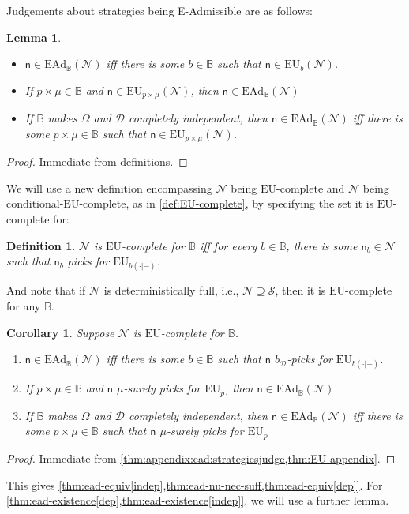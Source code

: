 \documentclass[a4paper]{article}
\newtheorem{definition}{Definition}
\newtheorem{lemma}[theorem]{Lemma}
\newtheorem{corollary}[theorem]{Corollary}
\newcommand\EU{\mathrm{EU}}
\newcommand\EAd{\mathrm{EAd}}
\newcommand{\Decs}{\mathcal{D}}
\renewcommand\S{\mathcal{S}}
\newcommand{\n}{\mathsf{n}}
\renewcommand{\nu}{\n}
\newcommand\Nu{\mathcal{N}}
\newcommand{\IB}{\mathbb{B}}
\renewcommand{\color}[1]{}
\newenvironment{colored}[1]{\leavevmode\color{#1}}{}
\newenvironment{CCM rewritten}
{\begingroup\color{blue}} %
{\endgroup}              %
\begin{document}
\begin{colored}{violet}
Judgements about strategies being E-Admissible are as follows:
\begin{lemma}\label{thm:appendix:ead:strategiesjudge}
	\begin{itemize}
		\item $\nu\in\EAd_\IB(\Nu)$ iff there is some $b\in\IB$ such that $\nu\in\EU_b(\Nu)$.  
		\item If $p\times\mu\in \IB$ and $\nu\in\EU_{p\times\mu}(\Nu)$, then $\nu\in\EAd_\IB(\Nu)$ 
		\item If $\IB$ makes $\Omega$ and $\Decs$ completely independent, then $\nu\in\EAd_\IB(\Nu)$ iff there is some $p\times\mu\in\IB$ such that $\nu\in\EU_{p\times\mu}(\Nu)$.  
	\end{itemize}
\end{lemma}
\begin{proof}
	Immediate from definitions. 
\end{proof}
We will use a new definition encompassing $\Nu$ being $\EU$-complete and $\Nu$ being conditional-$\EU$-complete, as in \cref{def:EU-complete}, by specifying the set it is $\EU$-complete for: 
\begin{definition}
	$\Nu$ is $\EU$-complete for $\IB$ iff for every $b\in\IB$, there is some $\nu_b\in\Nu$ such that $\nu_b$ picks for $\EU_{b(\cdot|-)}$. 
\end{definition}
And note that if $\Nu$ is deterministically full, i.e., $\Nu\supseteq\S$, then it is $\EU$-complete for any $\IB$. 
\begin{corollary}\label{thm:appendix:ead:eu}
	Suppose $\Nu$ is $\EU$-complete for $\IB$.
	\begin{enumerate}
		\item $\nu\in\EAd_\IB(\Nu)$ iff there is some $b\in\IB$ such that $\nu$ $b_\Decs$-picks for $\EU_{b(\cdot|-)}$.  
		\item \label{itm:ead:2}If $p\times\mu\in \IB$ and $\nu$ $\mu$-surely picks for $\EU_p$, then $\nu\in\EAd_\IB(\Nu)$ 
		\item If $\IB$ makes $\Omega$ and $\Decs$ completely independent, then $\nu\in\EAd_\IB(\Nu)$ iff there is some $p\times\mu\in\IB$ such that $\nu$ $\mu$-surely picks for $\EU_p$
	\end{enumerate}
\end{corollary}
\begin{proof}
	Immediate from \cref{thm:appendix:ead:strategiesjudge,thm:EU appendix}.
\end{proof}
This gives \cref{thm:ead-equiv[indep],thm:ead-nu-nec-suff,thm:ead-equiv[dep]}. For \cref{thm:ead-existence[dep],thm:ead-existence[indep]}, we will use a further lemma. 



\end{colored}
\end{document}
